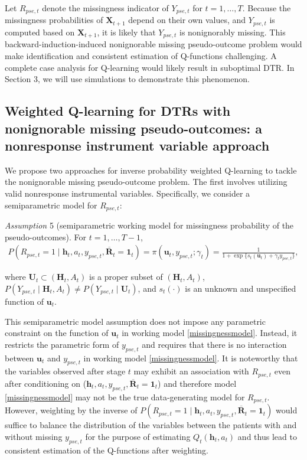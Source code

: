 \documentclass[12pt]{article}
\begin{document}
Let $R_{pse,t}$ denote the missingness indicator of $Y_{pse,t}$ for $t=1,\ldots,T$. Because the missingness probabilities of $\bm{X}_{t+1}$ depend on their own values, and $Y_{pse,t}$ is computed based on $\bm{X}_{t+1}$, it is likely that $Y_{pse,t}$ is nonignorably missing. This backward-induction-induced nonignorable missing pseudo-outcome problem would make identification and consistent estimation of Q-functions challenging. A complete case analysis for Q-learning would likely result in suboptimal DTR. In Section 3, we will use simulations to demonstrate this phenomenon. 

\subsection{Weighted Q-learning for DTRs with nonignorable missing pseudo-outcomes: a nonresponse instrument variable approach}

We propose two approaches for inverse probability weighted Q-learning to tackle the nonignorable missing pseudo-outcome problem. The first involves utilizing valid nonresponse instrumental variables. Specifically, we consider a semiparametric model for $R_{pse,t}$:
\begin{description}
    \item {\em Assumption} 5 (semiparametric working model for missingness probability of the pseudo-outcomes). For $t = 1,\ldots,T-1$, 
\begin{align}\label{missingnessmodel}
    P(R_{pse,t}=1\mid \bm{h}_t,a_t,y_{pse,t},\overline{\bm{R}}_t=\bm{1}_t) = \pi(\bm{u}_t,y_{pse,t};\gamma_t)= \frac{1}{1+\exp\{s_t(\bm{u}_t)+\gamma_t y_{pse,t}\}},
\end{align}
\end{description}where $\bm{U}_t \subset (\bm{H}_t,A_t)$ is a proper subset of $(\bm{H}_t,A_t)$, $P(Y_{pse,t}\mid \bm{H}_t, A_t) \neq P(Y_{pse,t}\mid \bm{U}_t)$, and $s_t(\cdot)$ is an unknown and unspecified function of $\bm{u}_t$. %

This semiparametric model assumption does not impose any parametric constraint on the function of $\bm{u}_t$ in working model \eqref{missingnessmodel}. Instead, it restricts the parametric form of $y_{pse,t}$ and requires that there is no interaction between $\bm{u}_t$ and $y_{pse,t}$ in working model \eqref{missingnessmodel}. 
It is noteworthy that the variables observed after stage $t$ may exhibit an association with $R_{pse,t}$ even after conditioning on ($\bm{h}_t,a_t,y_{pse,t},\overline{\bm{R}}_t=\bm{1}_t$) and therefore model \eqref{missingnessmodel} may not be the true data-generating model for $R_{pse,t}$. However,  weighting by the inverse of  $P(R_{pse,t}=1\mid \bm{h}_t,a_t,y_{pse,t},\overline{\bm{R}}_t=\bm{1}_t)$ would suffice to balance the distribution of the variables between the patients with and without missing $y_{pse,t}$ for the purpose of estimating $Q_t(\bm{h}_t,a_t)$ and thus lead to consistent estimation of the Q-functions after weighting. 
\end{document}

